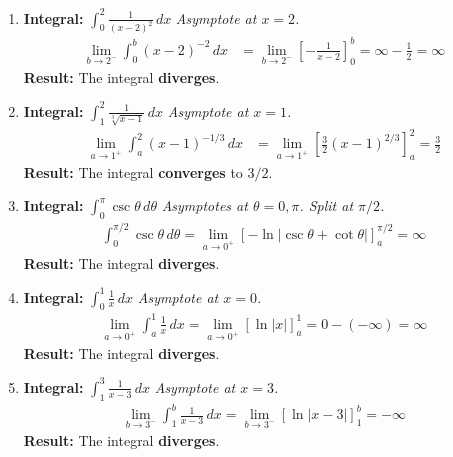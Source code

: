\documentclass[12pt]{article}
\begin{document}
\begin{enumerate}
    \item \textbf{Integral: } $\displaystyle \int_{0}^{2} \frac{1}{(x-2)^2} \,dx$
    \textit{Asymptote at $x=2$.}
    \begin{align*}
        \lim_{b \to 2^-} \int_{0}^{b} (x-2)^{-2} \,dx &= \lim_{b \to 2^-} \left[-\frac{1}{x-2}\right]_0^b = \infty - \frac{1}{2} = \infty
    \end{align*}
    \textbf{Result:} The integral \textbf{diverges}.

    \item \textbf{Integral: } $\displaystyle \int_{1}^{2} \frac{1}{\sqrt[3]{x-1}} \,dx$
    \textit{Asymptote at $x=1$.}
    \begin{align*}
        \lim_{a \to 1^+} \int_{a}^{2} (x-1)^{-1/3} \,dx &= \lim_{a \to 1^+} \left[\frac{3}{2}(x-1)^{2/3}\right]_a^2 = \frac{3}{2}
    \end{align*}
    \textbf{Result:} The integral \textbf{converges} to $3/2$.

    \item \textbf{Integral: } $\displaystyle \int_{0}^{\pi} \csc\theta \,d\theta$
    \textit{Asymptotes at $\theta=0, \pi$. Split at $\pi/2$.}
    \begin{align*}
        \int_{0}^{\pi/2} \csc\theta \,d\theta = \lim_{a \to 0^+} [-\ln|\csc\theta+\cot\theta|]_a^{\pi/2} = \infty
    \end{align*}
    \textbf{Result:} The integral \textbf{diverges}.

    \item \textbf{Integral: } $\displaystyle \int_{0}^{1} \frac{1}{x} \,dx$
    \textit{Asymptote at $x=0$.}
    \begin{align*}
        \lim_{a \to 0^+} \int_{a}^{1} \frac{1}{x} \,dx = \lim_{a \to 0^+} [\ln|x|]_a^1 = 0 - (-\infty) = \infty
    \end{align*}
    \textbf{Result:} The integral \textbf{diverges}.

    \item \textbf{Integral: } $\displaystyle \int_{1}^{3} \frac{1}{x-3} \,dx$
    \textit{Asymptote at $x=3$.}
    \begin{align*}
        \lim_{b \to 3^-} \int_{1}^{b} \frac{1}{x-3} \,dx = \lim_{b \to 3^-} [\ln|x-3|]_1^b = -\infty
    \end{align*}
    \textbf{Result:} The integral \textbf{diverges}.
\end{enumerate}
\end{document}
